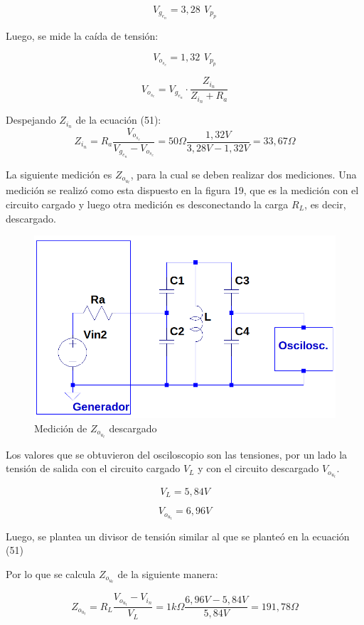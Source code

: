 \begin{equation}
    V_g_e_n = 3,28 \,\ V_p_p
\end{equation}

Luego, se mide la caída de tensión:

\begin{equation}
    V_o_s_c = 1,32 \,\ V_p_p
\end{equation}

\begin{equation}
   V_o_s_c  = V_g_e_n \cdot \frac{Z_i_n}{Z_i_n+R_a} 
\end{equation}

Despejando \(Z_i_n\) de la ecuación (51):
\begin{equation}
    Z_i_n = R_a \frac{V_o_s_c}{V_g_e_n-V_o_s_c} = 50\Omega \frac{1,32V}{3,28V-1,32V} = \boxed{33,67 \Omega}
\end{equation}

\newpage
La siguiente medición es \(Z_o_u_t\), para la cual se deben realizar dos mediciones. Una medición se realizó como esta dispuesto en la figura 19, que es la medición con el circuito cargado y luego otra medición es desconectando la carga \(R_L\), es decir, descargado.

\begin{figure}[!h]
    \centering
    \includegraphics[scale=0.4]{Imagenes/Zout.png}
    \caption{Medición de \(Z_o_u_t\) descargado}
    \label{fig:Zin}
\end{figure}

Los valores que se obtuvieron del osciloscopio son las tensiones, por un lado la tensión de salida con el circuito cargado \(V_L\) y con el circuito descargado \(V_o_u_t\).

\begin{equation}
    V_L = 5,84 V
\end{equation}

\begin{equation}
    V_o_u_t = 6,96 V
\end{equation}

Luego, se plantea un divisor de tensión similar al que se planteó en la ecuación (51)

Por lo que se calcula \(Z_o_u_t\) de la siguiente manera:

\begin{equation}
    Z_o_u_t = R_L \frac{V_o_u_t-V_i_n}{V_L} = 1k\Omega\frac{6,96V-5,84V}{5,84V} = \boxed{191,78\Omega}
\end{equation}


